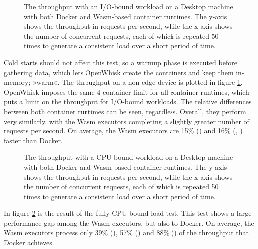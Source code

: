 \begin{figure}
    \begin{center}
        
    \end{center}
    \caption{The throughput with an I/O-bound workload on a Desktop machine with both Docker and Wasm-based container runtimes. The y-axis shows the throughput in requests per second, while the x-axis shows the number of concurrent requests, each of which is repeated 50 times to generate a consistent load over a short period of time.}
    \label{fig:pc-load-block}
\end{figure}

Cold starts should not affect this test, so a warmup phase is executed before gathering data, which lets OpenWhisk create the containers and keep them in-memory; »warm«. The throughput on a non-edge device is plotted in figure \ref{fig:pc-load-block}. OpenWhisk imposes the same 4 container limit for all container runtimes, which puts a limit on the throughput for I/O-bound workloads. The relative differences between both container runtimes can be seen, regardless. Overall, they perform very similarly, with the Wasm executors completing a slightly greater number of requests per second. On average, the Wasm executors are 15\% () and 16\% (, ) faster than Docker.

\begin{figure}
    \begin{center}
        
    \end{center}
    \caption{The throughput with a CPU-bound workload on a Desktop machine with both Docker and Wasm-based container runtimes. The y-axis shows the throughput in requests per second, while the x-axis shows the number of concurrent requests, each of which is repeated 50 times to generate a consistent load over a short period of time.}
    \label{fig:pc-load-hash}
\end{figure}

In figure \ref{fig:pc-load-hash} is the result of the fully CPU-bound load test. This test shows a large performance gap among the Wasm executors, but also to Docker. On average, the Wasm executors process only 39\% (), 57\% () and 88\% () of the throughput that Docker achieves.

